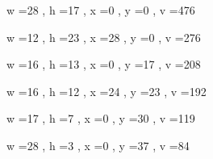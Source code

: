 \documentclass[11pt]{article}
\begin{document}
w =28 , h =17 , x =0 , y =0 , v =476
\par
w =12 , h =23 , x =28 , y =0 , v =276
\par
w =16 , h =13 , x =0 , y =17 , v =208
\par
w =16 , h =12 , x =24 , y =23 , v =192
\par
w =17 , h =7 , x =0 , y =30 , v =119
\par
w =28 , h =3 , x =0 , y =37 , v =84
\par
\newpage
\end{document}
